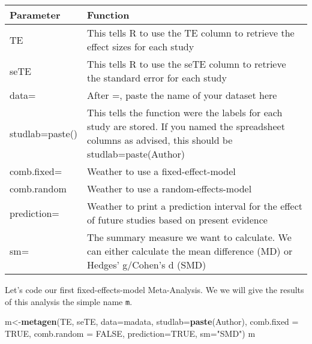 \documentclass[]{book}
\newenvironment{Shaded}{\begin{snugshade}}{\end{snugshade}}
\newcommand{\KeywordTok}[1]{\textcolor[rgb]{0.13,0.29,0.53}{\textbf{#1}}}
\newcommand{\DataTypeTok}[1]{\textcolor[rgb]{0.13,0.29,0.53}{#1}}
\newcommand{\StringTok}[1]{\textcolor[rgb]{0.31,0.60,0.02}{#1}}
\newcommand{\OtherTok}[1]{\textcolor[rgb]{0.56,0.35,0.01}{#1}}
\newcommand{\NormalTok}[1]{#1}
\theoremstyle{definition}
\theoremstyle{definition}
\theoremstyle{definition}
\theoremstyle{remark}
\begin{document}
\begin{tabular}{l|l}
\hline
Parameter & Function\\
\hline
TE & This tells R to use the TE column to retrieve the effect sizes for each study\\
\hline
seTE & This tells R to use the seTE column to retrieve the standard error for each             study\\
\hline
data= & After =, paste the name of your dataset here\\
\hline
studlab=paste() & This tells the function were the labels for each study are stored. If you named the spreadsheet columns as advised, this should be studlab=paste(Author)\\
\hline
comb.fixed= & Weather to use a fixed-effect-model\\
\hline
comb.random & Weather to use a random-effects-model\\
\hline
prediction= & Weather to print a prediction interval for the effect of future studies based on present evidence\\
\hline
sm= & The summary measure we want to calculate. We can either calculate the mean difference (MD) or Hedges' g/Cohen's d (SMD)\\
\hline
\end{tabular}

Let's code our first fixed-effects-model Meta-Analysis. We we will give
the results of this analysis the simple name \texttt{m}.

\begin{Shaded}
\begin{Highlighting}[]
\NormalTok{m<-}\KeywordTok{metagen}\NormalTok{(TE,}
\NormalTok{        seTE,}
        \DataTypeTok{data=}\NormalTok{madata,}
        \DataTypeTok{studlab=}\KeywordTok{paste}\NormalTok{(Author),}
        \DataTypeTok{comb.fixed =} \OtherTok{TRUE}\NormalTok{,}
        \DataTypeTok{comb.random =} \OtherTok{FALSE}\NormalTok{,}
        \DataTypeTok{prediction=}\OtherTok{TRUE}\NormalTok{,}
        \DataTypeTok{sm=}\StringTok{"SMD"}\NormalTok{)}
\NormalTok{m}
\end{Highlighting}
\end{Shaded}
\end{document}
